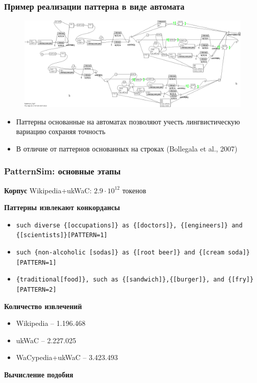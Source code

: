 \documentclass{beamer}
\begin{document}
\begin{frame}
\frametitle{Пример реализации паттерна в виде автомата}

\begin{figure}	
	\centering
		\includegraphics[width=1.0\textwidth]{figures/pattern2}
	\end{figure}

\begin{itemize}
  \item Паттерны основанные на автоматах позволяют учесть лингвистическую вариацию сохраняя
  точность
	  \item В отличие от паттернов основанных на строках (Bollegala et al., 2007)
	
\end{itemize}

\end{frame}





\begin{frame}
\frametitle{PatternSim: основные этапы}

\textbf{Корпус} Wikipedia+ukWaC: $2.9\cdot10^{12}$ токенов

\textbf{Паттерны извлекают конкордансы}

\begin{itemize}
  \item \texttt{such diverse \{[occupations]\} as
  \{[doctors]\}, \{[engineers]\} and \{[scientists]\}[PATTERN=1]}
  \item \texttt{such \{non-alcoholic [sodas]\} as \{[root beer]\} and \{[cream soda]\}[PATTERN=1]}
  \item \texttt{\{traditional[food]\}, such as \{[sandwich]\},\{[burger]\}, and \{[fry]\}[PATTERN=2]}
\end{itemize}

\textbf{Количество извлечений}

\begin{itemize}
  \item Wikipedia -- 1.196.468 
  \item ukWaC -- 2.227.025 
  \item WaCypedia+ukWaC -- 3.423.493
\end{itemize}

\textbf{Вычисление подобия}

\end{frame}
\end{document}
